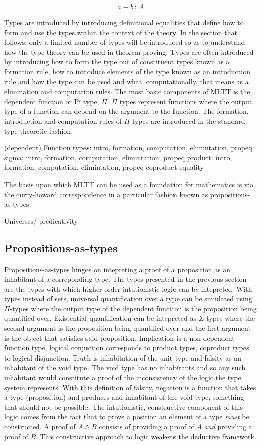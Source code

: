 \begin{align*}
    a \equiv b \, : \, A
\end{align*}

Types are introduced by introducing definitional equalities that define how to
form and use the types within the context of the theory. In the section that
follows, only a limited number of types will be introduced so as to understand
how the type theory can be used in theorem proving. Types are often introduced
by introducing how to form the type out of constituent types known as a
formation rule, how to introduce elements of the type known as an introduction
rule and how the type can be used and what, computationally, that means as a
elimination and computation rules. The most basic components of MLTT is the
dependent function or Pi type, $\Pi$. $\Pi$ types represent functions where the
output type of a function can depend on the argument to the function. The
formation, introduction and computation rules of $\Pi$ types are introduced in
the standard type-theoretic fashion.

(dependent) Function types: intro, formation, computation, elimintation, propeq
sigma: intro, formation, computation, elimintation, propeq
product: intro, formation, computation, elimintation, propeq
coproduct
equality

The basis upon which MLTT can be used as a foundation for mathematics is via the
curry-howard correspondence in a particular fashion known as
propositions-as-types.

Universes/ predicativity

\subsection{Propositions-as-types}
Propositions-as-types hinges on intepreting a proof of a proposition as an
inhabitant of a correponding type. The types presented in the previous section
are the types with which higher order intutionistic logic can be intepreted.
With types instead of sets, universal quantification over a type can be
simulated using $\Pi$-types where the output type of the dependent function is
the proposition being quantified over. Existential quantification can be
intepreted as $\Sigma$ types where the second argument is the proposition being
quantified over and the first argument is the object that satisfies said
proposition. Implication is a non-dependent function type, logical conjuction
corresponds to product types, coproduct types to logical disjunction. Truth is
inhabitation of the unit type and falsity as an inhabitant of the void type. The
void type has no inhabitants and so any such inhabitant would constitute a proof
of the inconsistency of the logic the type system represents. With this
definition of falsity, negation is a function that takes a type (proposition)
and produces and inhabitant of the void type, something that should not be
possible. The intutionistic, constructive component of this logic comes from the
fact that to prove a position an element of a type \textit{must} be constructed.
A proof of $A \land B$ consists of providing a proof of $A$ \textit{and}
providing a proof of $B$. This constructive approach to logic weakens the
deductive framework.

